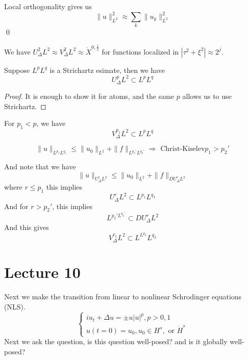 Local orthogonality gives us
\begin{equation*}
    \|u\|_{L^2}^2\approx\sum_k\|u_k\|_{L^2}^2
\end{equation*}
\qed

\begin{corollary}
    We have $U_\Delta^2L^2\approx V_\Delta^2L^2\approx\dot{X}^{0,\frac{1}{2}}$ for functions localized in $|\tau^2+\xi^2|\approx 2^j$.
\end{corollary}

\begin{proposition}
    Suppose $L^pL^q$ is a Strichartz esimate, then we have
    \begin{equation*}
        U_\Delta^pL^2\subset L^pL^q
    \end{equation*}
\end{proposition}
\begin{proof}
    It is enough to show it for atoms, and the same $p$ allows us to use Strichartz.
\end{proof}

\begin{corollary}
    For $p_1<p$, we have
    \begin{equation*}
        V_\Delta^{p_1}L^2\subset L^pL^q
    \end{equation*}
\end{corollary}
\begin{equation*}
    \|u\|_{L^{p_1}L^{q_1}}\leq \|u_0\|_{L^2}+\|f\|_{L^{p_2'}L^{q_2'}}\Rightarrow \text{ Christ-Kiselev} p_1>p_2'
\end{equation*}

And note that we have
\begin{equation*}
    \|u\|_{U_\Delta^r L^2}\leq\|u_0\|_{L^2}+\|f\|_{DU_\Delta^rL^2}
\end{equation*}
where $r\leq p_1$ this implies
\begin{equation*}
    U_\Delta^rL^2\subset L^{p_1}L^{q_1}
\end{equation*}
And for $r>p_2'$, this implies
\begin{equation*}
    L^{p_2'L^{q_2'}}\subset DU_\Delta^rL^2
\end{equation*}
And this gives
\begin{equation*}
    V_\Delta^{r_1}L^2\subset L^{L^{p_2}}L^{q_2}
\end{equation*}



\section{Lecture 10}
Next we make the transition from linear to nonlinear Schrodinger equations (NLS).
\begin{equation*}
    \begin{cases}
        iu_t+\Delta u=\pm u|u|^p, p>0,1\\
        u(t=0)=u_0, u_0\in H^s, \text{ or } \dot{H}^s
    \end{cases}
\end{equation*}
Next we ask the question, is this question well-posed? and is it globally well-posed?

